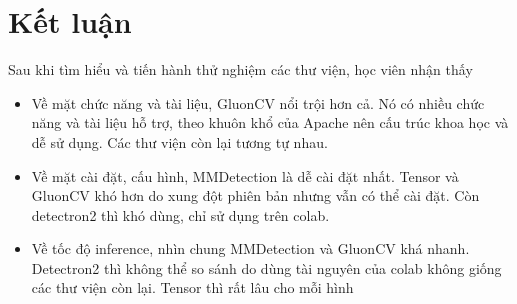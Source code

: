 \section{Kết luận}
\label{sec:compare}

Sau khi tìm hiểu và tiến hành thử nghiệm các thư viện, học viên nhận thấy

\begin{itemize}
    \item Về mặt chức năng và tài liệu, GluonCV nổi trội hơn cả. Nó có nhiều chức năng và tài liệu hỗ trợ, theo khuôn khổ của Apache nên cấu trúc khoa học và dễ sử dụng. Các thư viện còn lại tương tự nhau.
    \item Về mặt cài đặt, cấu hình, MMDetection là dễ cài đặt nhất. Tensor và GluonCV khó hơn do xung đột phiên bản nhưng vẫn có thể cài đặt. Còn detectron2 thì khó dùng, chỉ sử dụng trên colab.
    \item Về tốc độ inference, nhìn chung MMDetection và GluonCV khá nhanh. Detectron2 thì không thể so sánh do dùng tài nguyên của colab không giống các thư viện còn lại. Tensor thì rất lâu cho mỗi hình
\end{itemize}